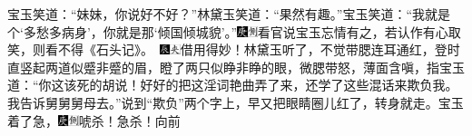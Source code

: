 宝玉笑道：``妹妹，你说好不好？''林黛玉笑道：``果然有趣。''宝玉笑道：``我就是个`多愁多病身'，你就是那`倾国倾城貌'。''{{\includegraphics[width=3mm]{../Images/00004}\includegraphics[width=3mm]{../Images/00011}\footnotesize \kaishu 看官说宝玉忘情有之，若认作有心取笑，则看不得《石头记》。　}\includegraphics[width=3mm]{../Images/00009}\includegraphics[width=3mm]{../Images/00012}\footnotesize \kaishu 借用得妙！}林黛玉听了，不觉带腮连耳通红，登时直竖起两道似蹙非蹙的眉，瞪了两只似睁非睁的眼，微腮带怒，薄面含嗔，指宝玉道：``你这该死的胡说！好好的把这淫词艳曲弄了来，还学了这些混话来欺负我。我告诉舅舅舅母去。''说到``欺负''两个字上，早又把眼睛圈儿红了，转身就走。宝玉着了急，{\includegraphics[width=3mm]{../Images/00004}\includegraphics[width=3mm]{../Images/00011}\footnotesize \kaishu 唬杀！急杀！}向前